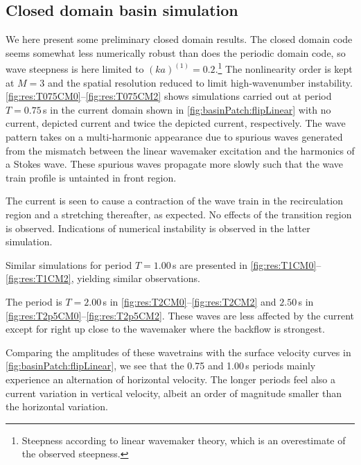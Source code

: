 \documentclass[a4paper,12pt]{article}
\renewcommand{\_}[1]{_\mr{#1}}
\newcommand{\oo}[1]{^{(#1)}}
\begin{document}
\subsection{Closed domain basin simulation}
We here present some preliminary closed domain results. 
The closed domain code seems somewhat less numerically robust than does the periodic domain code, so wave steepness is here limited to $(ka)\oo1=0.2$.\footnote{Steepness according to linear wavemaker theory, which is an overestimate of the observed steepness.}
The nonlinearity order is kept at $M=3$ and the spatial resolution reduced to limit high-wavenumber instability.
\autoref{fig:res:T075CM0}--\ref{fig:res:T075CM2} shows simulations carried out at period $T=0.75$\,s in the current domain shown in \autoref{fig:basinPatch:flipLinear} with no current, depicted current and twice the depicted current, respectively. 
The wave pattern takes on a multi-harmonic appearance due to spurious waves generated from the mismatch between the linear wavemaker excitation and the harmonics of a Stokes wave. 
These spurious waves propagate more slowly such that the wave train profile is untainted in front region.

The current is seen to cause a contraction of the wave train in the recirculation region and a stretching thereafter, as expected. 
No effects of the transition region is observed. Indications of numerical instability is observed in the latter simulation.



Similar simulations for period $T=1.00$\,s are presented in \autoref{fig:res:T1CM0}--\ref{fig:res:T1CM2}, yielding similar observations.

The period is $T=2.00$\,s in \autoref{fig:res:T2CM0}--\ref{fig:res:T2CM2} 
and $2.50$\,s in \autoref{fig:res:T2p5CM0}--\ref{fig:res:T2p5CM2}.
These waves are less affected by the current except for right up close to the wavemaker where the backflow is strongest.

Comparing the amplitudes of these wavetrains with the surface velocity curves in \autoref{fig:basinPatch:flipLinear}, we see that the 0.75 and 1.00\,s periods mainly experience an alternation of horizontal velocity. 
The longer periods feel also a current variation in vertical velocity, albeit an order of magnitude smaller than the horizontal variation.
\end{document}
